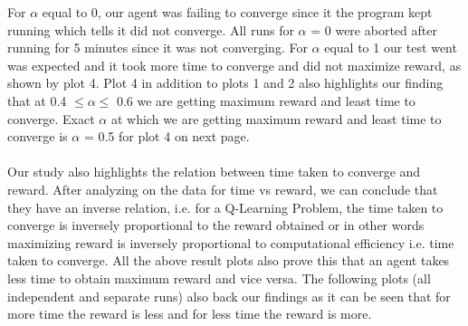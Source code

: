 \documentclass[conference]{IEEEtran}
\begin{document}
For $\alpha$ equal to 0, our agent was failing to converge since it the program kept running which tells it did not converge. All runs for $\alpha$ = 0 were aborted after running for 5 minutes since it was not converging. For $\alpha$ equal to 1 our test went was expected and it took more time to converge and did not maximize reward, as shown by plot 4. Plot 4 in addition to plots 1 and 2 also highlights our finding that at 0.4 $ \leq \alpha \leq$ 0.6 we are getting maximum reward and least time to converge. Exact $\alpha$ at which we are getting maximum reward and least time to converge is $\alpha$ = 0.5 for plot 4 on next page. \\ \\ Our study also highlights the relation between time taken to converge and reward. After analyzing on the data for time vs reward, we can conclude that they have an inverse relation, i.e. for a Q-Learning Problem, the time taken to converge is inversely proportional to the reward obtained or in other words maximizing reward is inversely proportional to computational efficiency i.e. time taken to converge. All the above result plots also prove this that an agent takes less time to obtain maximum reward and vice versa. The following plots (all independent and separate runs) also back our findings as it can be seen that for more time the reward is less and for less time the reward is more. 
\end{document}
